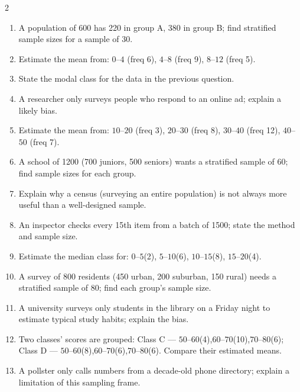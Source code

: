 \documentclass[11pt]{article}
\begin{document}
\begin{recapbox}
\begin{multicols}{2}
\small
\begin{enumerate}[leftmargin=*,itemsep=3pt]
  \item A population of 600 has 220 in group A, 380 in group B; find stratified sample sizes for a sample of 30.
  \item Estimate the mean from: $0$--$4$ (freq 6), $4$--$8$ (freq 9), $8$--$12$ (freq 5).
  \item State the modal class for the data in the previous question.
  \item A researcher only surveys people who respond to an online ad; explain a likely bias.
  \item Estimate the mean from: $10$--$20$ (freq 3), $20$--$30$ (freq 8), $30$--$40$ (freq 12), $40$--$50$ (freq 7).
  \item A school of 1200 (700 juniors, 500 seniors) wants a stratified sample of 60; find sample sizes for each group.
  \item Explain why a census (surveying an entire population) is not always more useful than a well-designed sample.
  \item An inspector checks every 15th item from a batch of 1500; state the method and sample size.
  \item Estimate the median class for: $0$--$5$(2), $5$--$10$(6), $10$--$15$(8), $15$--$20$(4).
  \item A survey of 800 residents (450 urban, 200 suburban, 150 rural) needs a stratified sample of 80; find each group's sample size.
  \item A university surveys only students in the library on a Friday night to estimate typical study habits; explain the bias.
  \item Two classes' scores are grouped: Class C --- $50$--$60$(4),$60$--$70$(10),$70$--$80$(6); Class D --- $50$--$60$(8),$60$--$70$(6),$70$--$80$(6). Compare their estimated means.
  \item A pollster only calls numbers from a decade-old phone directory; explain a limitation of this sampling frame.
\end{enumerate}
\end{multicols}
\end{recapbox}
\end{document}
